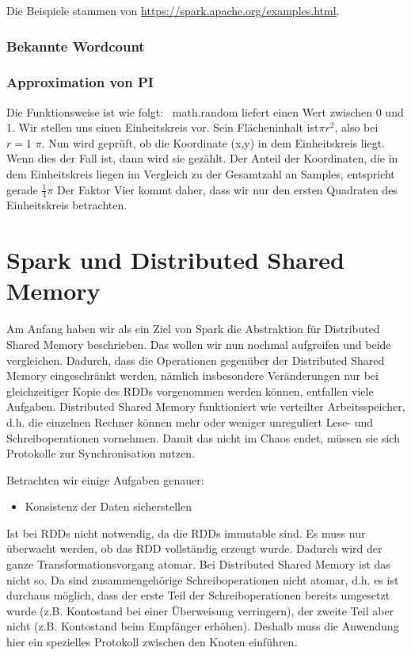 Die Beispiele stammen von \url{https://spark.apache.org/examples.html}.

\subsubsection{Bekannte Wordcount}



\subsubsection{Approximation von PI}


Die Funktionsweise ist wie folgt: \ math.random liefert einen Wert
zwischen 0 und 1. Wir stellen uns einen Einheitskreis vor. Sein
Flächeninhalt ist$\pi r^2$, also bei $r=1$ $\pi$. Nun wird geprüft, ob die Koordinate (x,y) in
dem Einheitskreis liegt. Wenn dies der Fall ist, dann wird sie gezählt.
Der Anteil der Koordinaten, die in dem Einheitskreis liegen im
Vergleich zu der Gesamtzahl an Samples, entspricht gerade
$\frac{1}{4}\pi$ Der Faktor Vier
kommt daher, dass wir nur den ersten Quadraten des Einheitskreis
betrachten.

\section[Spark und Distributed Shared
Memory]{\rmfamily Spark und Distributed Shared
Memory}
Am Anfang haben wir als ein Ziel von Spark die Abstraktion für
Distributed Shared Memory beschrieben. Das wollen wir nun nochmal
aufgreifen und beide vergleichen. Dadurch, dass die Operationen
gegenüber der Distributed Shared Memory eingeschränkt werden, nämlich
insbesondere Veränderungen nur bei gleichzeitiger Kopie des RDDs
vorgenommen werden können, entfallen viele Aufgaben. Distributed Shared
Memory funktioniert wie verteilter Arbeitsspeicher, d.h. die einzelnen
Rechner können mehr oder weniger unreguliert Lese- und
Schreiboperationen vornehmen. Damit das nicht im Chaos endet, müssen
sie sich Protokolle zur Synchronisation nutzen. 

Betrachten wir einige Aufgaben genauer:


\begin{itemize}
\item Konsistenz der Daten sicherstellen
\end{itemize}
Ist bei RDDs nicht notwendig, da die RDDs immutable sind. Es muss nur
überwacht werden, ob das RDD vollständig erzeugt wurde. Dadurch wird der
ganze Transformationsvorgang atomar. Bei Distributed Shared Memory ist
das nicht so. Da sind zusammengehörige Schreiboperationen nicht atomar,
d.h. es ist durchaus möglich, dass der erste Teil der
Schreiboperationen bereits umgesetzt wurde (z.B. Kontostand bei einer
Überweisung verringern), der zweite Teil aber nicht (z.B. Kontostand
beim Empfänger erhöhen). Deshalb muss die Anwendung hier ein spezielles
Protokoll zwischen den Knoten einführen.

